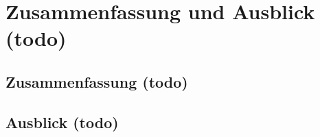 \begin{comment}
- Eine aktuelle Recherche (3. Januar 2017) in den einschlägigen deutschen Bestellportalen (Ebay, Amazon, Conrad, Euronics, …) ergab, dass Geräte mit CWUSB-Unterstützung dort derzeit in Deutschland nicht bestellbar sind. Bei Amazon ließen sich in den Kundenrezensionen Spuren finden, dass im Jahr 2010 entsprechende Geräte auch vertrieben wurden. Zwei Entwicklungen machen es den Geräten schwer, sich am Markt zu behaupten: Einerseits wurde mit USB 3.0 die Datendurchsatzrate deutlich angehoben, was die Anforderungen an den Wireless-USB-Standard verschärft. Andererseits hat die Marktentwicklung bei den Smartphones die Verbreitung des Bluetooth-Standards stark ausgebaut. Während das Bluetooth-Konsortium seinen Standard laufend weiterentwickelt (zuletzt 2016 mit Version 5), datiert die letzte Version des USBCV-Tools für den Test und die Entwicklung von Wireless USB auf den 17. Juli 2009. Vor diesem Hintergrund erscheint es derzeit fraglich, ob CWUSB noch einmal aus der Versenkung auftauchen wird. [Wikipedia, Wireless USB]

- Vielleicht sollte man sich diese Einschätzung für das Fazit aufgewahren? Komnsumer Markt nein, Spezial Markt ja.

- UWB-Module
	- Stärker Prozessor um den DWM mit maximaler SPI-Geschwindigkeit anzusteuern (20 Mhz)
	- Identifier über DIP Schalter einstellbar
	- Größerer Speicher um mehr Anchor/Tags verwalten zu können.
\end{comment}

\chapter{Zusammenfassung und Ausblick (todo)}

\section{Zusammenfassung (todo)}

\section{Ausblick (todo)}